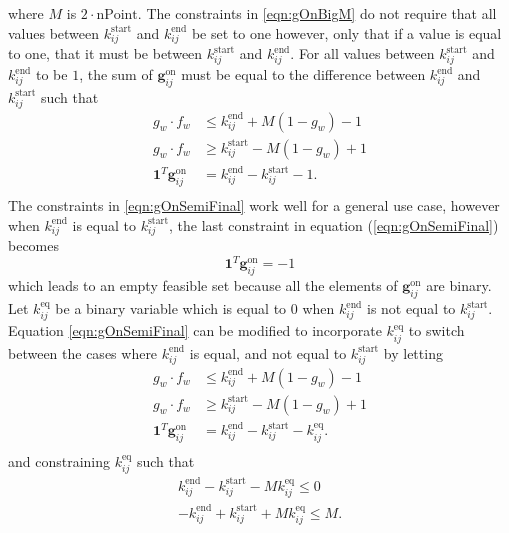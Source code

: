 where $M$ is $2\cdot\text{nPoint}$. The constraints in \eqref{eqn:gOnBigM} do not require that all values between $k_{ij}^{\text{start}}$ and $k_{ij}^{\text{end}}$ be set to one however, only that if a value is equal to one, that it must be between $k_{ij}^{\text{start}}$ and $k_{ij}^{\text{end}}$. For all values between  $k_{ij}^{\text{start}}$ and $k_{ij}^{\text{end}}$ to be $1$, the sum of $\mathbf{g}_{ij}^{\text{on}}$ must be equal to the difference between $k_{ij}^{\text{end}}$ and $k_{ij}^{\text{start}}$ such that 
\begin{equation} \label{eqn:gOnSemiFinal}\begin{aligned}
	g_w\cdot f_w &\le k^{\text{end}}_{ij} + M(1 - g_w) - 1 \\
	g_w\cdot f_w &\ge k^{\text{start}}_{ij} - M(1 - g_w) + 1 \\ 
	\mathbf{1}^T\mathbf{g}_{ij}^{\text{on}} &= k_{ij}^{\text{end}} - k_{ij}^{\text{start}} - 1.\\
\end{aligned} \end{equation}
The constraints in \eqref{eqn:gOnSemiFinal} work well for a general use case, however when $k_{ij}^{\text{end}}$ is equal to $k_{ij}^{\text{start}}$, the last constraint in equation (\ref{eqn:gOnSemiFinal}) becomes
\begin{equation}
	\mathbf{1}^T\mathbf{g}_{ij}^{\text{on}} = -1
\end{equation}
which leads to an empty feasible set because all the elements of $\mathbf{g}_{ij}^{\text{on}}$ are binary. Let $k_{ij}^{\text{eq}}$ be a binary variable which is equal to $0$ when $k_{ij}^{\text{end}}$ is not equal to $k_{ij}^{\text{start}}$. Equation \eqref{eqn:gOnSemiFinal} can be modified to incorporate $k_{ij}^{\text{eq}}$ to switch between the cases where $k_{ij}^{\text{end}}$ is equal, and not equal to $k_{ij}^{\text{start}}$ by letting 
\begin{equation} \label{eqn:gOnFinal}\begin{aligned}
	g_w\cdot f_w &\le k^{\text{end}}_{ij} + M(1 - g_w) - 1 \\
	g_w\cdot f_w &\ge k^{\text{start}}_{ij} - M(1 - g_w) + 1 \\ 
	\mathbf{1}^T\mathbf{g}_{ij}^{\text{on}} &= k_{ij}^{\text{end}} - k_{ij}^{\text{start}} - k_{ij}^{\text{eq}}.\\
\end{aligned} \end{equation} 
 and constraining $k_{ij}^{\text{eq}}$ such that 
\begin{equation}\label{eqn:kEq}\begin{aligned}
	k_{ij}^{\text{end}} - k_{ij}^{\text{start}} - M k_{ij}^{\text{eq}} \le 0 \\
	-k_{ij}^{\text{end}} + k_{ij}^{\text{start}} + M k_{ij}^{\text{eq}} \le M .
\end{aligned}\end{equation}
